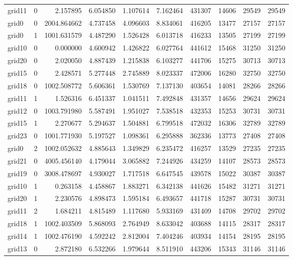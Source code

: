 \begin{longtable}{|l|r|r|r|r|r|r|r|r|r|}
grid11 & 0 & 2.157895 & 6.054850 & 1.107614 & 7.162464 & 431307 & 14606 & 29549 & 29549 \\
grid0 & 0 & 2004.864662 & 4.737458 & 4.096603 & 8.834061 & 416205 & 13477 & 27157 & 27157 \\
grid0 & 1 & 1001.631579 & 4.487290 & 1.526428 & 6.013718 & 416233 & 13505 & 27199 & 27199 \\
grid10 & 0 & 0.000000 & 4.600942 & 1.426822 & 6.027764 & 441612 & 15468 & 31250 & 31250 \\
grid20 & 0 & 2.020050 & 4.887439 & 1.215838 & 6.103277 & 441706 & 15275 & 30713 & 30713 \\
grid15 & 0 & 2.428571 & 5.277448 & 2.745889 & 8.023337 & 472006 & 16280 & 32750 & 32750 \\
grid18 & 0 & 1002.508772 & 5.606361 & 1.530769 & 7.137130 & 403654 & 14081 & 28266 & 28266 \\
grid11 & 1 & 1.526316 & 6.451337 & 1.041511 & 7.492848 & 431357 & 14656 & 29624 & 29624 \\
grid12 & 0 & 1003.791980 & 5.587491 & 1.951027 & 7.538518 & 432353 & 15253 & 30731 & 30731 \\
grid15 & 1 & 2.270677 & 5.294637 & 1.504881 & 6.799518 & 472032 & 16306 & 32789 & 32789 \\
grid23 & 0 & 1001.771930 & 5.197527 & 1.098361 & 6.295888 & 362336 & 13773 & 27408 & 27408 \\
grid0 & 2 & 1002.052632 & 4.885643 & 1.349829 & 6.235472 & 416257 & 13529 & 27235 & 27235 \\
grid21 & 0 & 4005.456140 & 4.179044 & 3.065882 & 7.244926 & 434259 & 14107 & 28573 & 28573 \\
grid19 & 0 & 3008.478697 & 4.930027 & 1.717518 & 6.647545 & 439578 & 15022 & 30387 & 30387 \\
grid10 & 1 & 0.263158 & 4.458867 & 1.883271 & 6.342138 & 441626 & 15482 & 31271 & 31271 \\
grid20 & 1 & 2.230576 & 4.898473 & 1.595184 & 6.493657 & 441718 & 15287 & 30731 & 30731 \\
grid11 & 2 & 1.684211 & 4.815489 & 1.117680 & 5.933169 & 431409 & 14708 & 29702 & 29702 \\
grid18 & 1 & 1002.403509 & 5.868093 & 2.764949 & 8.633042 & 403688 & 14115 & 28317 & 28317 \\
grid14 & 1 & 1002.476190 & 4.592242 & 2.812004 & 7.404246 & 403934 & 14154 & 28195 & 28195 \\
grid13 & 0 & 2.872180 & 6.532266 & 1.979644 & 8.511910 & 443206 & 15343 & 31146 & 31146 \\

\end{longtable}
